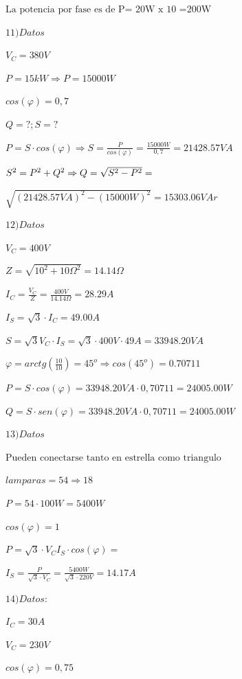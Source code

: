$\text{La potencia por fase es de P= 20W x 10 =200W}$

\vspace{1cm}

$11) Datos$

$V_C=380V$

$P=15kW\Rightarrow P=15000W$

$cos(\varphi)=0,7$

$Q=? ;S=?$

$P=S\cdot cos(\varphi)\Rightarrow S=\frac{P}{cos(\varphi)}=\frac{15000W}{0,7}=21428.57VA$

$S^2=P^2+Q^2\Rightarrow \\Q=\sqrt{S^2-P^2}=$

$\sqrt{(21428.57VA)^2-(15000W)^2}=15303.06VAr$


\vspace{1cm}

$12) Datos$

$V_C=400V$

$Z=\sqrt{10^2+10\Omega^2}=14.14 \Omega$

$I_C=\frac{V_C}{Z}=\frac{400V}{14.14\Omega}=28.29A$

$I_S=\sqrt{3}\cdot I_C=49.00A$

$S=\sqrt{3} V_C\cdot I_S=\sqrt{3}\cdot 400V\cdot 49A = 33948.20VA$

$\varphi=arctg(\frac{10}{10})= 45^o\Rightarrow cos(45^o)=0.70711$

$P=S \cdot cos(\varphi)=33948.20VA \cdot 0,70711=24005.00W$

$Q=S\cdot sen(\varphi)=33948.20VA \cdot 0,70711=24005.00W$

\vspace{1cm}

$13)Datos$

$\text{Pueden conectarse tanto en estrella como triangulo}$

$lamparas =54 \Rightarrow 18$

$P=54\cdot100W=5400W$

$cos(\varphi)=1$

$P=\sqrt{3} \cdot V_C I_S \cdot cos(\varphi)=$

$I_S=\frac{P}{\sqrt{3}\cdot V_C}=\frac{5400W}{\sqrt{3}\cdot 220V}=14.17A$

\vspace{1cm}

$14)Datos:$

$I_C=30A$

$V_C=230V$

$cos(\varphi)=0,75$

